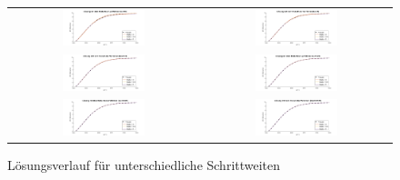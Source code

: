 \documentclass[11pt,a4paper]{article}
\begin{document}
	\begin{figure}
\begin{tabular}{cc}
  \includegraphics[width=0.45\textwidth]{Bild1-1} &   \includegraphics[width=0.45\textwidth]{Bild1-2} \\
  \includegraphics[width=0.45\textwidth]{Bild1-3} &   \includegraphics[width=0.45\textwidth]{Bild1-4} \\
  \includegraphics[width=0.45\textwidth]{Bild1-5} &   \includegraphics[width=0.45\textwidth]{Bild1-6} \\
\end{tabular}
\caption{L\"osungsverlauf f\"ur unterschiedliche Schrittweiten}
\end{figure}
\end{document}
